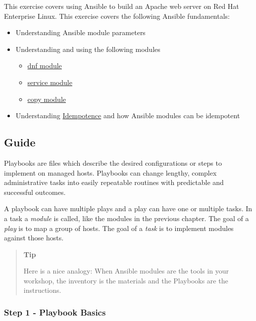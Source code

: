 This exercise covers using Ansible to build an Apache web server on
Red Hat Enterprise Linux. This exercise covers the following Ansible
fundamentals:

\begin{itemize}
\tightlist
\item
  Understanding Ansible module parameters
\item
  Understanding and using the following modules

  \begin{itemize}
  \tightlist
  \item
    \href{https://docs.ansible.com/ansible/latest/modules/dnf_module.html}{dnf
    module}
  \item
    \href{https://docs.ansible.com/ansible/latest/modules/service_module.html}{service
    module}
  \item
    \href{https://docs.ansible.com/ansible/latest/modules/copy_module.html}{copy
    module}
  \end{itemize}
\item
  Understanding
  \href{https://en.wikipedia.org/wiki/Idempotence}{Idempotence} and how
  Ansible modules can be idempotent
\end{itemize}

\hypertarget{guide}{%
\subsection{Guide}\label{guide}}

Playbooks are files which describe the desired configurations or steps
to implement on managed hosts. Playbooks can change lengthy, complex
administrative tasks into easily repeatable routines with predictable
and successful outcomes.

A playbook can have multiple plays and a play can have one or multiple
tasks. In a task a \emph{module} is called, like the modules in the
previous chapter. The goal of a \emph{play} is to map a group of hosts.
The goal of a \emph{task} is to implement modules against those hosts.

\begin{quote}
\textbf{Tip}

Here is a nice analogy: When Ansible modules are the tools in your
workshop, the inventory is the materials and the Playbooks are the
instructions.
\end{quote}

\hypertarget{step-1---playbook-basics}{%
\subsubsection{Step 1 - Playbook
Basics}\label{step-1---playbook-basics}}

